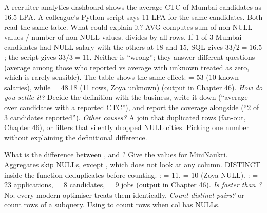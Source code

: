 \begin{qa}{\deep A recruiter-analytics dashboard shows the average CTC of Mumbai candidates as 16.5 LPA. A colleague's Python script says 11 LPA for the
same candidates. Both read the same table. What could explain it?}
\why AVG computes sum of non-NULL values / number of non-NULL values.  divides by all rows. If 1 of 3 Mumbai candidates
had NULL salary with the others at 18 and 15, SQL gives $33/2 = 16.5$; the script gives $33/3 = 11$. Neither is ``wrong''; they answer different
questions (average among those who reported vs average with unknown treated as zero, which is rarely sensible).
\worked The  table shows the same effect:  = 53 (10 known salaries), while  = 48.18 (11
rows, Zoya unknown) (output  in Chapter 46).
\pushes \emph{How do you settle it?} Decide the definition with the business, write it down (``average over candidates with a reported CTC''), and report
the coverage alongside (``2 of 3 candidates reported''). \emph{Other causes?} A join that duplicated rows (fan-out, Chapter 46), or 
filters that silently dropped NULL cities.
\pitfall Picking one number without explaining the definitional difference.
\end{qa}

\begin{qa}{What is the difference between ,  and ? Give the values for MiniNaukri.}
\why Aggregates skip NULLs, except , which does not look at any column. DISTINCT inside the function deduplicates before counting.
\worked {}:  = 11,  = 10 (Zoya NULL). :  = 23 applications,
 = 8 candidates,  = 9 jobs (output  in Chapter 46).
\pushes \emph{Is  faster than ?} No; every modern optimiser treats them identically. \emph{Count distinct pairs?}
 or count rows of a  subquery.
\pitfall Using  to count rows when col has NULLs.
\end{qa}
